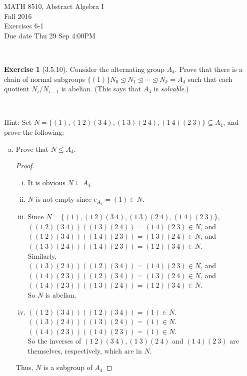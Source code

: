 \documentclass{amsart}
\theoremstyle{plain}
\theoremstyle{definition}
\newtheorem{exer}[lem]{Exercise}
\begin{document}
\noindent MATH 8510, Abstract Algebra I \\
Fall 2016\\
Exercises 6-1\\
Due date Thu 29 Sep 4:00PM

\

%
%

\begin{exer}[3.5.10]
Consider the alternating group $A_4$.
Prove that there is a chain of normal subgroups $\{(1)\}N_0\unlhd N_1\unlhd\cdots\unlhd N_k=A_4$ such that each quotient $N_i/N_{i-1}$ is abelian.
(This says that $A_4$ is \emph{solvable}.)

\

\noindent
Hint: 
Set $N=\{(1),(1\ 2)(3\ 4),(1\ 3)(2\ 4),(1\ 4)(2\ 3)\}\subseteq A_4$, and prove the following:
\begin{enumerate}[(a)]
\item 
Prove that $N\leq A_4$. 

\begin{proof}
  \begin{enumerate}[(i)]
	  \item It is obvious $N \subseteq A_4$
	  \item $N$ is not empty since $e_{A_4} = (1) \in N$.
	  \item Since $N=\{(1), (1~ 2)(3~ 4),(1~ 3)(2~ 4),(1~ 4)(2~ 3)\}$, \\
	  	$\left((1~ 2)(3~ 4)\right)\left((1~ 3)(2~ 4)\right) = (1~ 4)(2~ 3) \in N$, and \\
	  	$\left((1~ 2)(3~ 4)\right)\left((1~ 4)(2~ 3)\right) = (1~ 3)(2~ 4)\in N$, and\\
	  	$\left((1~ 3)(2~ 4)\right)\left((1~ 4)(2~ 3)\right) = (1~ 2)(3~ 4)\in N$.\\
		Similarly, \\
	  	$\left((1~ 3)(2~ 4)\right)\left((1~ 2)(3~ 4)\right) = (1~ 4)(2~ 3) \in N$, and \\
	  	$\left((1~ 4)(2~ 3)\right)\left((1~ 2)(3~ 4)\right) = (1~ 3)(2~ 4)\in N$, and\\
	  	$\left((1~ 4)(2~ 3)\right)\left((1~ 3)(2~ 4)\right) = (1~ 2)(3~ 4)\in N$.\\
	  	So $N$ is abelian.
	  \item $\left((1~ 2)(3~ 4)\right)\left((1~ 2)(3~ 4)\right) = (1) \in N$.\\
			$\left((1~ 3)(2~ 4)\right)\left((1~ 3)(2~ 4)\right) = (1) \in N$.\\
				$\left((1~ 4)(2~ 3)\right)\left((1~ 4)(2~ 3)\right) = (1) \in N$.\\
		So the inverses of $(1~ 2)(3~ 4),(1~ 3)(2~ 4)$ and $(1~ 4)(2~ 3)$ are themselves, respectively, which are in $N$.
	\end{enumerate}
	Thus, $N$ is a subgroup of $A_4$
\end{proof}


\end{enumerate}
\end{exer}
\end{document}

